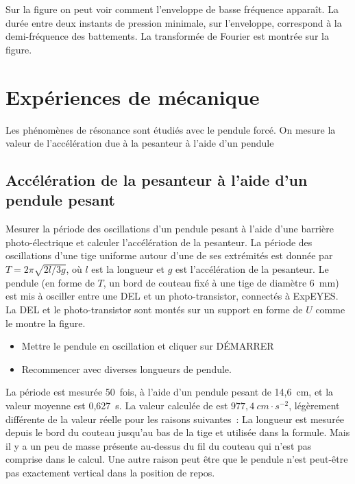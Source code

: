 \documentclass[a4paper,12pt,french]{sphinxmanual}
\let\sphinxpxdimen\pdfpxdimen\else\newdimen\sphinxpxdimen
\begin{document}

Sur la figure on peut voir comment l’enveloppe de basse fréquence
apparaît. La durée entre deux instants de pression minimale, sur
l’enveloppe, correspond à la demi-fréquence des battements. La
transformée de Fourier est montrée sur la figure.


\chapter{Expériences de mécanique}
\label{\detokenize{index:experiences-de-mecanique}}
Les phénomènes de résonance sont étudiés avec le pendule forcé. On
mesure la valeur de l’accélération due à la pesanteur à l’aide d’un
pendule


\section{Accélération de la pesanteur à l’aide d’un pendule pesant}
\label{\detokenize{6.1:acceleration-de-la-pesanteur-a-laide-dun-pendule-pesant}}\label{\detokenize{6.1::doc}}

Mesurer la période des oscillations d’un pendule pesant à l’aide d’une
barrière photo-électrique et calculer l’accélération de la pesanteur. La
période des oscillations d’une tige uniforme autour d’une de ses
extrémités est donnée par \(T = 2\pi\sqrt{2l/3g}\), où \(l\) est la
longueur et \(g\) est l’accélération de la pesanteur. Le pendule (en forme
de \(T\), un bord de couteau fixé à une tige de diamètre 6 mm) est mis à
osciller entre une DEL et un photo-transistor, connectés à ExpEYES. La
DEL et le photo-transistor sont montés sur un support en forme de \(U\)
comme le montre la figure.

\noindent\sphinxincludegraphics[width=300\sphinxpxdimen]{{rod-pendulum}.pdf}
\noindent\sphinxincludegraphics[width=300\sphinxpxdimen]{{light-barrier-photo}.pdf}

\begin{itemize}
\item {} 
Mettre le pendule en oscillation et cliquer sur DÉMARRER

\item {} 
Recommencer avec diverses longueurs de pendule.

\end{itemize}


La période est mesurée 50 fois, à l’aide d’un pendule pesant de
14,6 cm, et la valeur moyenne est 0,627 s. La valeur calculée de
 est \(977,4~cm\cdot s^{-2}\), légèrement différente de la
valeur réelle pour les raisons suivantes : La longueur est mesurée
depuis le bord du couteau jusqu’au bas de la tige et utilisée dans la
formule. Mais il y a un peu de masse présente au-dessus du fil du
couteau qui n’est pas comprise dans le calcul. Une autre raison peut
être que le pendule n’est peut-être pas exactement vertical dans la
position de repos.
\end{document}
